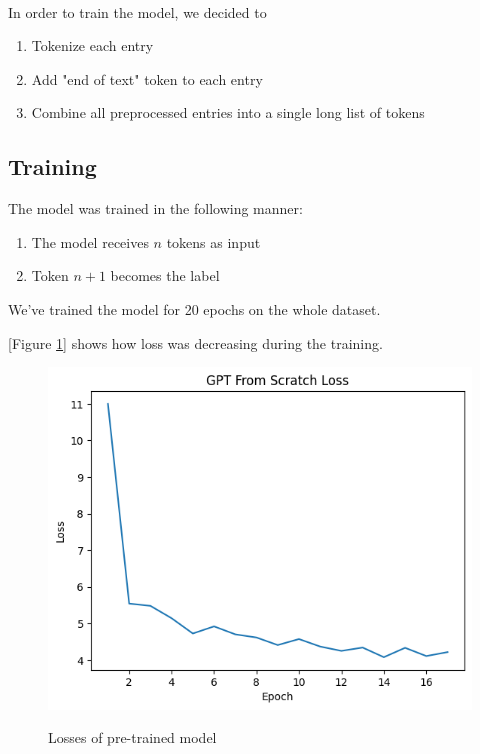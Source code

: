 \documentclass[12pt]{article}
\begin{document}
\paragraph{}
In order to train the model, we decided to
\begin{enumerate}
	\item Tokenize each entry
	\item Add "end of text" token to each entry
	\item Combine all preprocessed entries into a single long list of tokens
\end{enumerate}

\subsection{Training}

The model was trained in the following manner:
\begin{enumerate}
	\item The model receives $n$ tokens as input
	\item Token $n + 1$ becomes the label
\end{enumerate}

We've trained the model for 20 epochs on the whole dataset.

[Figure \ref{pic:scratch_gpt_loss}] shows how loss was decreasing during the training.

\begin{figure}[ht]
\caption{Losses of pre-trained model}
\includegraphics[width=\textwidth]{img/scratch_gpt_loss.png}
\label{pic:scratch_gpt_loss}
\end{figure}
\end{document}
